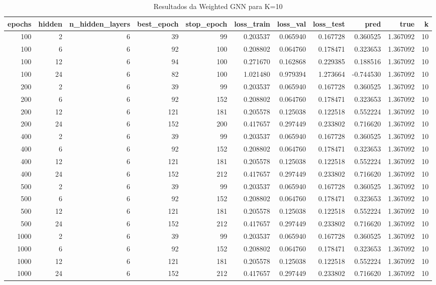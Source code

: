 \begin{table}
\caption{Resultados da Weighted GNN para K=10}
\label{tab:weighted_gnn_results_k10}
\begin{tabular}{rrrrrrrrrrr}
\toprule
epochs & hidden & n\_hidden\_layers & best\_epoch & stop\_epoch & loss\_train & loss\_val & loss\_test & pred & true & k \\
\midrule
100 & 2 & 6 & 39 & 99 & 0.203537 & 0.065940 & 0.167728 & 0.360525 & 1.367092 & 10 \\
100 & 6 & 6 & 92 & 100 & 0.208802 & 0.064760 & 0.178471 & 0.323653 & 1.367092 & 10 \\
100 & 12 & 6 & 94 & 100 & 0.271670 & 0.162868 & 0.229385 & 0.188516 & 1.367092 & 10 \\
100 & 24 & 6 & 82 & 100 & 1.021480 & 0.979394 & 1.273664 & -0.744530 & 1.367092 & 10 \\
200 & 2 & 6 & 39 & 99 & 0.203537 & 0.065940 & 0.167728 & 0.360525 & 1.367092 & 10 \\
200 & 6 & 6 & 92 & 152 & 0.208802 & 0.064760 & 0.178471 & 0.323653 & 1.367092 & 10 \\
200 & 12 & 6 & 121 & 181 & 0.205578 & 0.125038 & 0.122518 & 0.552224 & 1.367092 & 10 \\
200 & 24 & 6 & 152 & 200 & 0.417657 & 0.297449 & 0.233802 & 0.716620 & 1.367092 & 10 \\
400 & 2 & 6 & 39 & 99 & 0.203537 & 0.065940 & 0.167728 & 0.360525 & 1.367092 & 10 \\
400 & 6 & 6 & 92 & 152 & 0.208802 & 0.064760 & 0.178471 & 0.323653 & 1.367092 & 10 \\
400 & 12 & 6 & 121 & 181 & 0.205578 & 0.125038 & 0.122518 & 0.552224 & 1.367092 & 10 \\
400 & 24 & 6 & 152 & 212 & 0.417657 & 0.297449 & 0.233802 & 0.716620 & 1.367092 & 10 \\
500 & 2 & 6 & 39 & 99 & 0.203537 & 0.065940 & 0.167728 & 0.360525 & 1.367092 & 10 \\
500 & 6 & 6 & 92 & 152 & 0.208802 & 0.064760 & 0.178471 & 0.323653 & 1.367092 & 10 \\
500 & 12 & 6 & 121 & 181 & 0.205578 & 0.125038 & 0.122518 & 0.552224 & 1.367092 & 10 \\
500 & 24 & 6 & 152 & 212 & 0.417657 & 0.297449 & 0.233802 & 0.716620 & 1.367092 & 10 \\
1000 & 2 & 6 & 39 & 99 & 0.203537 & 0.065940 & 0.167728 & 0.360525 & 1.367092 & 10 \\
1000 & 6 & 6 & 92 & 152 & 0.208802 & 0.064760 & 0.178471 & 0.323653 & 1.367092 & 10 \\
1000 & 12 & 6 & 121 & 181 & 0.205578 & 0.125038 & 0.122518 & 0.552224 & 1.367092 & 10 \\
1000 & 24 & 6 & 152 & 212 & 0.417657 & 0.297449 & 0.233802 & 0.716620 & 1.367092 & 10 \\
\bottomrule
\end{tabular}
\end{table}
